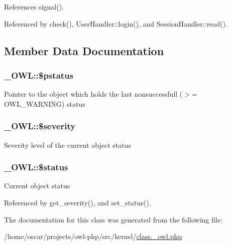References signal().



Referenced by check(), UserHandler::login(), and SessionHandler::read().



\subsection{Member Data Documentation}
\subsubsection[{\$pstatus}]{\setlength{\rightskip}{0pt plus 5cm}\_\-OWL::\$pstatus}\label{class__OWL_af30c6ce2c59df6da2ef0f7059be9231e}
Pointer to the object which holds the last nonsuccessfull ($>$= OWL\_\-WARNING) status 
\subsubsection[{\$severity}]{\setlength{\rightskip}{0pt plus 5cm}\_\-OWL::\$severity}\label{class__OWL_ad26b40a9dbbacb33e299b17826f8327c}
Severity level of the current object status 
\subsubsection[{\$status}]{\setlength{\rightskip}{0pt plus 5cm}\_\-OWL::\$status}\label{class__OWL_aaf448f6bc8a90e20c09e9e2b8fe46eb5}
Current object status 

Referenced by get\_\-severity(), and set\_\-status().



The documentation for this class was generated from the following file:\begin{DoxyCompactItemize}
\item 
/home/oscar/projects/owl-\/php/src/kernel/\hyperlink{class_8__owl_8php}{class.\_\-owl.php}\end{DoxyCompactItemize}
